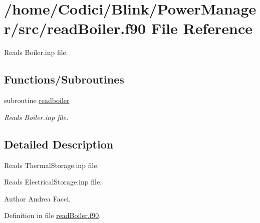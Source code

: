 \hypertarget{read_boiler_8f90}{\section{/home/\-Codici/\-Blink/\-Power\-Manager/src/read\-Boiler.f90 File Reference}
\label{read_boiler_8f90}
}


Reads Boiler.\-inp file.  


\subsection*{Functions/\-Subroutines}
\begin{DoxyCompactItemize}
\item 
subroutine \hyperlink{read_boiler_8f90_adab96107665a1fca087b8e0a54026105}{readboiler}
\begin{DoxyCompactList}\small\item\em Reads Boiler.\-inp file. \end{DoxyCompactList}\end{DoxyCompactItemize}


\subsection{Detailed Description}
Reads Thermal\-Storage.\-inp file.

Reads Electrical\-Storage.\-inp file.

\begin{DoxyAuthor}{Author}
Andrea Facci. 
\end{DoxyAuthor}


Definition in file \hyperlink{read_boiler_8f90_source}{read\-Boiler.\-f90}.



